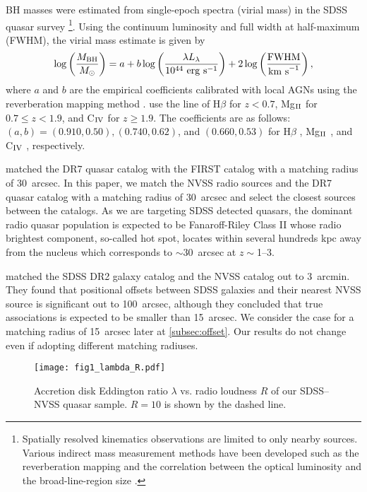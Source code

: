 \documentclass[preprint2,twocolappendix]{aastex6}
\begin{document}
 BH masses were estimated from single-epoch spectra (virial mass) in the SDSS quasar survey \citep{she11}\footnote{Spatially resolved kinematics observations are limited to only nearby sources. Various indirect mass measurement methods have been developed such as the reverberation mapping \citep[e.g.][]{bla82,pet93,kas00} and the correlation between the optical luminosity and the broad-line-region size \citep[e.g.][]{kas00,mcl01,ves02}. }. Using the continuum luminosity and full width at half-maximum (FWHM), the virial mass estimate is given by
\begin{equation}
\log \left(\frac{M_{\rm BH}}{M_\odot}\right) = a + b \log \left(\frac{\lambda L_\lambda}{10^{44}~{\rm erg\ s}^{-1}}\right)+2\log \left(\frac{{\rm FWHM}}{{\rm km~s}^{-1}}\right),
\end{equation}
where $a$ and $b$ are the empirical coefficients calibrated with local AGNs using the reverberation mapping method \citep[e.g.][]{bla82,pet93,kas00}. \citet{she11} use the line of H$\beta$ for $z<0.7$, Mg$_{\rm II}$ for $0.7\le z<1.9$, and C$_{\rm IV}$ for $z\ge1.9$. The coefficients are as follows: $(a, b) = (0.910,0.50), (0.740,0.62)$, and $(0.660,0.53)$ for H$\beta$ \citep{ves06}, Mg$_{\rm II}$ \citep{mcl04,she11}, and C$_{\rm IV}$ \citep{ves06}, respectively.


\citet{she11} matched the DR7 quasar catalog with the FIRST catalog with a matching radius of 30~arcsec. In this paper, we match the NVSS radio sources and the DR7 quasar catalog with a matching radius of 30~arcsec and select the closest sources between the catalogs. As we are targeting SDSS detected quasars, the dominant radio quasar population is expected to be Fanaroff-Riley Class II \citep[FR-II;][]{fan74} whose radio brightest component, so-called hot spot, locates within several hundreds kpc away from the nucleus \citep[e.g.,][]{mul08} which corresponds to $\sim30$~arcsec at $z\sim$1--3. 

\citet{bes05} matched the SDSS DR2 galaxy catalog and the NVSS catalog out to 3~arcmin. They found that positional offsets between SDSS galaxies and their nearest NVSS source is significant out to 100~arcsec, although they concluded that true associations is expected to be smaller than 15~arcsec. We consider the case for a matching radius of 15~arcsec later at \autoref{subsec:offset}. Our results do not change even if adopting different matching radiuses.



\begin{figure}[t]
 \begin{center}
  \texttt{[image: fig1\_lambda\_R.pdf]} 
 \end{center}
\caption{Accretion disk Eddington ratio $\lambda$ vs. radio loudness $R$ of our SDSS--NVSS quasar sample. $R=10$ is shown by the dashed line.}\label{fig:lambda-R}
\end{figure}
\end{document}

